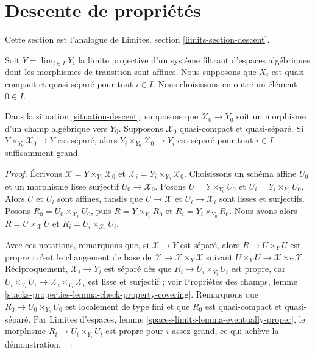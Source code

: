 \section{Descente de propriétés}
\label{section-descent}

\noindent
Cette section est l'analogue de Limites, section \ref{limits-section-descent}.

\begin{situation}
\label{situation-descent}
Soit $Y = \lim_{i \in I} Y_i$ la limite projective d'un système filtrant
d'espaces algébriques dont les morphismes de transition sont affines. Nous
supposons que $X_i$ est quasi-compact et quasi-séparé pour tout $i \in I$.
Nous choisissons en outre un élément $0 \in I$.
\end{situation}

\begin{lemma}
\label{lemma-eventually-separated}
Dans la situation \ref{situation-descent}, supposons que
$\mathcal{X}_0 \to Y_0$ soit un morphisme d'un champ algébrique vers $Y_0$.
Supposons $\mathcal{X}_0$ quasi-compact et quasi-séparé. Si
$Y \times_{Y_0} \mathcal{X}_0 \to Y$ est séparé, alors
$Y_i \times_{Y_0} \mathcal{X}_0 \to Y_i$ est séparé pour tout $i \in I$
suffisamment grand.
\end{lemma}

\begin{proof}
Écrivons $\mathcal{X} = Y \times_{Y_0} \mathcal{X}_0$ et
$\mathcal{X}_i = Y_i \times_{Y_0} \mathcal{X}_0$. Choisissons un schéma
affine $U_0$ et un morphisme lisse surjectif
$U_0 \to \mathcal{X}_0$. Posons $U = Y \times_{Y_0} U_0$ et
$U_i = Y_i \times_{Y_0} U_0$. Alors $U$ et $U_i$ sont affines, tandis que
$U \to \mathcal{X}$ et $U_i \to \mathcal{X}_i$ sont lisses et surjectifs.
Posons $R_0 = U_0 \times_{\mathcal{X}_0} U_0$, puis
$R = Y \times_{Y_0} R_0$ et $R_i = Y_i \times_{Y_0} R_0$. Nous avons alors
$R = U \times_\mathcal{X} U$ et
$R_i = U_i \times_{\mathcal{X}_i} U_i$.

\medskip\noindent
Avec ces notations, remarquons que, si $\mathcal{X} \to Y$ est séparé, alors
$R \to U \times_Y U$ est propre : c'est le changement de base de
$\mathcal{X} \to \mathcal{X} \times_Y \mathcal{X}$ suivant
$U \times_Y U \to \mathcal{X} \times_Y \mathcal{X}$. Réciproquement,
$\mathcal{X}_i \to Y_i$ est séparé dès que
$R_i \to U_i \times_{Y_i} U_i$ est propre, car
$U_i \times_{Y_i} U_i \to \mathcal{X}_i \times_{Y_i} \mathcal{X}_i$ est
lisse et surjectif ; voir Propriétés des champs, lemme
\ref{stacks-properties-lemma-check-property-covering}. Remarquons que
$R_0 \to U_0 \times_{Y_0} U_0$ est localement de type fini et que $R_0$ est
quasi-compact et quasi-séparé. Par Limites d'espaces, lemme
\ref{spaces-limits-lemma-eventually-proper}, le morphisme
$R_i \to U_i \times_{Y_i} U_i$ est propre pour $i$ assez grand, ce qui achève
la démonstration.
\end{proof}







